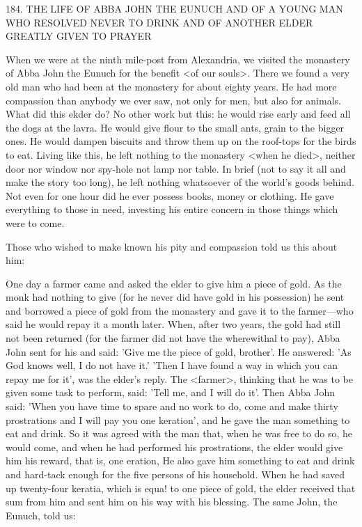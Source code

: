 184.
THE LIFE OF ABBA JOHN THE EUNUCH
AND OF A YOUNG MAN WHO RESOLVED NEVER TO DRINK
AND OF ANOTHER ELDER GREATLY GIVEN TO PRAYER

When we were at the ninth mile-post from Alexandria, we visited
the monastery of Abba John the Eunuch for the benefit <of our
souls>.
There we found a very old man who had been at the
monastery for about eighty years.
He had more compassion than
anybody we ever saw, not only for men, but also for animals.
What
did this ekder do? No other work but this: he would rise early and
feed all the dogs at the lavra.
He would give flour to the small ants,
grain to the bigger ones.
He would dampen biscuits and throw them
up on the roof-tops for the birds to eat.
Living like this, he left
nothing to the monastery <when he died>, neither door nor window
nor spy-hole not lamp nor table.
In brief (not to say it all and make
the story too long), he left nothing whatsoever of the world's goods
behind.
Not even for one hour did he ever possess books, money or
clothing.
He gave everything to those in need, investing his entire
concern in those things which were to come.

Those who wished to make known his pity and compassion told
us this about him:

One day a farmer came and asked the elder to give him a piece of
gold.
As the monk had nothing to give (for he never did have gold
in his possession) he sent and borrowed a piece of gold from the
monastery and gave it to the farmer—who said he would repay it
a month later.
When, after two years, the gold had still not been
returned (for the farmer did not have the wherewithal to pay), Abba
John sent for his and said: 'Give me the piece of gold, brother'.
He
answered: 'As God knows well, I do not have it.' 'Then I have
found a way in which you can repay me for it', was the elder's
reply.
The <farmer>, thinking that he was to be given some task to
perform, said: 'Tell me, and I will do it'.
Then Abba John said:
'When you have time to spare and no work to do, come and make
thirty prostrations and I will pay you one keration', and he gave the
man something to eat and drink.
So it was agreed with the man
that, when he was free to do so, he would come, and when he had
performed his prostrations, the elder would give him his reward,
that is, one eration, He also gave him something to eat and drink
and hard-tack enough for the five persons of his household.
When
he had saved up twenty-four keratia, which is equa! to one piece of
gold, the elder received that sum from him and sent him on his way
with his blessing.
The same John, the Eunuch, told us:


